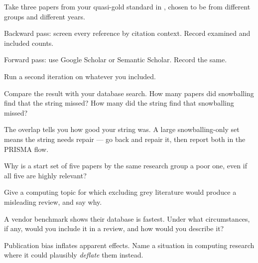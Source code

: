 \begin{lab}
Take three papers from your quasi-gold standard in , chosen to be
from different groups and different years.

\begin{tightnum}
  \item Backward pass: screen every reference by citation context. Record
    examined and included counts.
  \item Forward pass: use Google Scholar or Semantic Scholar. Record the same.
  \item Run a second iteration on whatever you included.
  \item Compare the result with your database search. How many papers did
    snowballing find that the string missed? How many did the string find that
    snowballing missed?
\end{tightnum}

\medskip
The overlap tells you how good your string was. A large snowballing-only set
means the string needs repair --- go back and repair it, then report both in
the PRISMA flow.
\end{lab}

\begin{checkpoint}
\begin{tightnum}
  \item Why is a start set of five papers by the same research group a poor
    one, even if all five are highly relevant?
  \item Give a computing topic for which excluding grey literature would
    produce a misleading review, and say why.
  \item A vendor benchmark shows their database is fastest. Under what
    circumstances, if any, would you include it in a review, and how would you
    describe it?
  \item Publication bias inflates apparent effects. Name a situation in
    computing research where it could plausibly \emph{deflate} them instead.
\end{tightnum}
\end{checkpoint}

